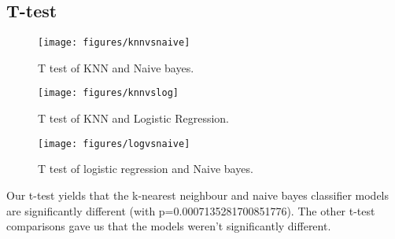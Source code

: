 \subsection{T-test}
    \begin{figure}[H]
      \centering
        \texttt{[image: figures/knnvsnaive]}
        \caption{T test of KNN and Naive bayes.}
        \label{fig:k}
    \end{figure}
    \begin{figure}[H]
      \centering
        \texttt{[image: figures/knnvslog]}
        \caption{T test of KNN and Logistic Regression.}
        \label{fig:k}
    \end{figure}
    \begin{figure}[H]
      \centering
        \texttt{[image: figures/logvsnaive]}
        \caption{T test of logistic regression and Naive bayes.}
        \label{fig:k}
    \end{figure}
Our t-test yields that the k-nearest neighbour and naive bayes classifier models are significantly different (with p=0.0007135281700851776). The other t-test comparisons gave us that the models weren't significantly different.

